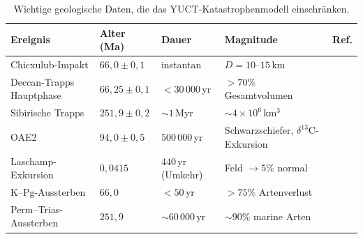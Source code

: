 \documentclass[11pt,a4paper]{article}
\begin{document}
	\begin{table}[H]
		\centering
		\small
		\caption{Wichtige geologische Daten, die das YUCT-Katastrophenmodell einschränken.}
		\label{tab:geodata}
		\begin{tabular}{@{}p{4.2cm} p{2.6cm} p{2.8cm} p{4.2cm} p{1.2cm}@{}}
			\toprule
			\textbf{Ereignis} & \textbf{Alter (Ma)} & \textbf{Dauer} & \textbf{Magnitude} & \textbf{Ref.} \\
			\midrule
			Chicxulub-Impakt & \(66,0 \pm 0,1\) & instantan & \(D = 10\)–\(15\) km & \cite{Schulte2010} \\
			Deccan-Trapps Hauptphase & \(66,25 \pm 0,1\) & \(<30\,000\) yr & \(>70\%\) Gesamtvolumen & \cite{Schoene2019} \\
			Sibirische Trapps & \(251,9 \pm 0,2\) & \(\sim 1\) Myr & \(\sim 4\times10^6\) km\(^3\) & \cite{SiberianTraps} \\
			OAE2 & \(94,0 \pm 0,5\) & \(500\,000\) yr & Schwarzschiefer, \(\delta^{13}\)C-Exkursion & \cite{Jenkyns2010} \\
			Laschamp-Exkursion & \(0,0415\) & \(440\) yr (Umkehr) & Feld \(\to 5\%\) normal & \cite{Laschamp} \\
			K–Pg-Aussterben & \(66,0\) & \(<50\) yr & \(>75\%\) Artenverlust & \cite{Schulte2010} \\
			Perm–Trias-Aussterben & \(251,9\) & \(\sim 60\,000\) yr & \(\sim 90\%\) marine Arten & \cite{Burgess2014} \\
			\bottomrule
		\end{tabular}
	\end{table}
	
\end{document}
